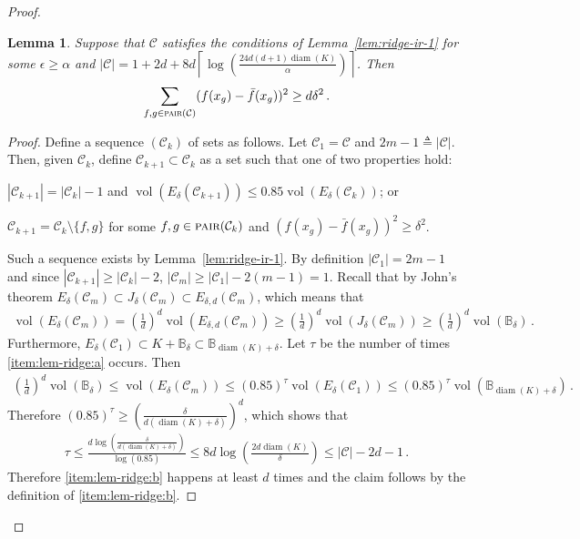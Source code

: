 \documentclass[letter, 12pt]{report}
\newcommand{\ceil}[1]{\left\lceil #1 \right\rceil}
\newcommand{\pair}{\operatorname{\textsc{pair}}}
\newcommand{\ball}{\mathbb{B}}
\newcommand{\cC}{\mathcal C}
\newcommand{\vol}{\operatorname{vol}}
\newcommand{\diam}{\operatorname{diam}}
\newcommand{\1}{\mathbf{1}}
\theoremstyle{plain}
\newtheorem{lemma}[theorem]{Lemma}
\theoremstyle{definition}
\theoremstyle{remark}
\begin{document}
\begin{proof}
    \begin{lemma}\label{lem:ridge-ir-2}
        Suppose that $\cC$ satisfies the conditions of Lemma~\ref{lem:ridge-ir-1} for some $\epsilon \geq \alpha$ and
        $|\cC| = 1 + 2d + 8 d \ceil{\log\left(\frac{24d(d+1) \diam(K)}{\alpha}\right)}$. Then
        \begin{align*}
            \sum_{f,g \in \pair(\cC)} (f(x_g) - \bar f(x_g))^2 \geq d \delta^2 \,.
        \end{align*}
    \end{lemma}

    \begin{proof}
        Define a sequence $(\cC_k)$ of sets as follows.
        Let $\cC_1 = \cC$ and $2m-1 \triangleq |\cC|$. Then, given $\cC_k$, define $\cC_{k+1} \subset \cC_k$ as a set such that one of two properties hold:
        \begin{enumroman}
            \item $|\cC_{k+1}| = |\cC_k| - 1$ and $\vol(E_\delta(\cC_{k+1})) \leq 0.85 \vol(E_\delta(\cC_k))$; or \label{item:lem-ridge:a}
            \item $\cC_{k+1} = \cC_k \setminus \{f, g\}$ for some $f, g \in \pair(\cC_k)$ and $(f(x_g) - \bar f(x_g))^2 \geq \delta^2$. \label{item:lem-ridge:b}
        \end{enumroman}
        Such a sequence exists by Lemma~\ref{lem:ridge-ir-1}.
        By definition $|\cC_1| = 2m-1$ and since $|\cC_{k+1}| \geq |\cC_k| - 2$, $|\cC_m| \geq |\cC_1| - 2(m-1) = 1$.
        Recall that by John's theorem $E_\delta(\cC_m) \subset J_\delta(\cC_m) \subset E_{\delta,d}(\cC_m)$, which means that
        \begin{align*}
            \vol(E_\delta(\cC_m))
            = \left(\frac{1}{d}\right)^d \vol(E_{\delta,d}(\cC_m))
            \geq \left(\frac{1}{d}\right)^d \vol(J_\delta(\cC_m))
            \geq \left(\frac{1}{d}\right)^d \vol(\ball_\delta) \,.
        \end{align*}
        Furthermore, $E_\delta(\cC_1) \subset K + \ball_\delta \subset \ball_{\diam(K) + \delta}$.
        Let $\tau$ be the number of times \ref{item:lem-ridge:a} occurs. Then
        \begin{align*}
            \left(\frac{1}{d}\right)^d \vol(\ball_\delta) \leq \vol(E_\delta(\cC_m)) \leq (0.85)^\tau \vol(E_\delta(\cC_1)) \leq (0.85)^\tau \vol(\ball_{\diam(K)+\delta})\,.
        \end{align*}
        Therefore $(0.85)^\tau \geq \left(\frac{\delta}{d(\diam(K) + \delta)}\right)^d$,
        which shows that
        \begin{align*}
            \tau
            \leq \frac{d \log\left(\frac{\delta}{d(\diam(K) + \delta)}\right)}{\log(0.85)}
            \leq 8 d \log\left(\frac{2d \diam(K)}{\delta}\right)
            \leq |\cC| - 2d - 1\,.
        \end{align*}
        Therefore \ref{item:lem-ridge:b} happens at least $d$ times and the claim follows by the definition of \ref{item:lem-ridge:b}.
    \end{proof}


\end{proof}
\end{document}
